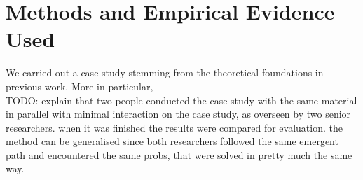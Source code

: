 \documentclass[conference]{IEEEtran}
\begin{document}
% 
%
%
%
%

\section{Methods and Empirical Evidence Used}\label{mm}
We carried out a case-study stemming from the theoretical foundations in previous work. More in particular, \\
TODO: explain that two people conducted the case-study with the same material in parallel with minimal interaction on the case study, as overseen by two senior researchers. when it was finished the results were compared for evaluation. the method can be generalised since both researchers followed the same emergent path and encountered the same probs, that were solved in pretty much the same way.\\
\end{document}

